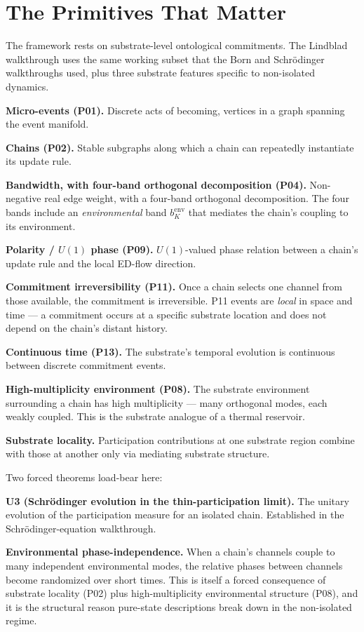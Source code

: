 \documentclass[11pt,a4paper]{article}
\begin{document}
\section{The Primitives That Matter}

The framework rests on substrate-level ontological commitments. The Lindblad walkthrough uses the same working subset that the Born and Schr\"odinger walkthroughs used, plus three substrate features specific to non-isolated dynamics.

\textbf{Micro-events (P01).} Discrete acts of becoming, vertices in a graph spanning the event manifold.

\textbf{Chains (P02).} Stable subgraphs along which a chain can repeatedly instantiate its update rule.

\textbf{Bandwidth, with four-band orthogonal decomposition (P04).} Non-negative real edge weight, with a four-band orthogonal decomposition. The four bands include an \emph{environmental} band $b_K^{\mathrm{env}}$ that mediates the chain's coupling to its environment.

\textbf{Polarity / $U(1)$ phase (P09).} $U(1)$-valued phase relation between a chain's update rule and the local ED-flow direction.

\textbf{Commitment irreversibility (P11).} Once a chain selects one channel from those available, the commitment is irreversible. P11 events are \emph{local} in space and time --- a commitment occurs at a specific substrate location and does not depend on the chain's distant history.

\textbf{Continuous time (P13).} The substrate's temporal evolution is continuous between discrete commitment events.

\textbf{High-multiplicity environment (P08).} The substrate environment surrounding a chain has high multiplicity --- many orthogonal modes, each weakly coupled. This is the substrate analogue of a thermal reservoir.

\textbf{Substrate locality.} Participation contributions at one substrate region combine with those at another only via mediating substrate structure.

Two forced theorems load-bear here:

\textbf{U3 (Schr\"odinger evolution in the thin-participation limit).} The unitary evolution of the participation measure for an isolated chain. Established in the Schr\"odinger-equation walkthrough.

\textbf{Environmental phase-independence.} When a chain's channels couple to many independent environmental modes, the relative phases between channels become randomized over short times. This is itself a forced consequence of substrate locality (P02) plus high-multiplicity environmental structure (P08), and it is the structural reason pure-state descriptions break down in the non-isolated regime.
\end{document}
